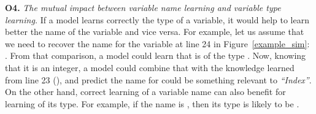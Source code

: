 %
%



\textbf{O4.} {\em The mutual impact between variable name learning and
  variable type learning.} If a model learns correctly the type of a
variable, it would help to learn better the name of the variable and
vice versa. For example, let us assume that we need to recover the
name  for the variable  at line 24 in
Figure~\ref{example_sim}: . From that comparison, a
model could learn that  is of the type . Now,
knowing that it is an integer, a model could combine that with the
knowledge learned from line 23 (), and predict the
name for  could be something relevant to {\em ``Index''}.
On the other hand, correct learning of a variable name can also
benefit for learning of its type. For example, if the name is
, then its type is likely to be .

